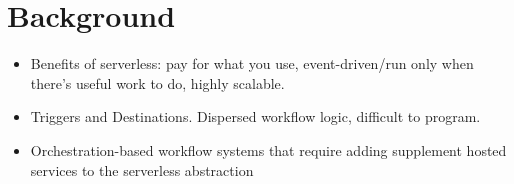 \section{Background}\label{sec:bg}

\begin{table*}[]
\centering
{}
\caption{Comparison with existing work}
\label{table:positioning}
\end{table*}



\begin{itemize}

	\item Benefits of serverless: pay for what you use, event-driven/run only
	when there's useful work to do, highly scalable.

	\item Triggers and Destinations. Dispersed workflow logic, difficult to
	program.

	\item Orchestration-based workflow systems that require adding supplement
	hosted services to the serverless abstraction

\end{itemize}

